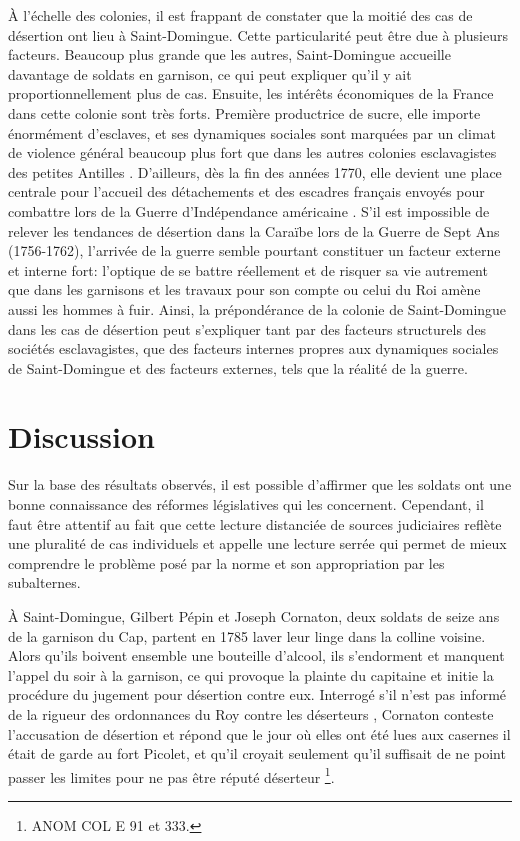 \documentclass[final, fra]{anthology-ch}     %
\begin{document}
À l'échelle des colonies, il est frappant de constater que la moitié des cas de désertion ont lieu à Saint-Domingue. Cette particularité peut être due à plusieurs facteurs. Beaucoup plus grande que les autres, Saint-Domingue accueille davantage de soldats en garnison, ce qui peut expliquer qu'il y ait proportionnellement plus de cas. Ensuite, les intérêts économiques de la France dans cette colonie sont très forts. Première productrice de sucre, elle importe énormément d'esclaves, et ses dynamiques sociales sont marquées par un climat de violence général beaucoup plus fort que dans les autres colonies esclavagistes des petites Antilles \cite{Rogers_raciser_la_société,butel-histoire-des-antilles}. D'ailleurs, dès la fin des années 1770, elle devient une place centrale pour l'accueil des détachements et des escadres français envoyés pour combattre lors de la Guerre d'Indépendance américaine \cite{lesueur_troupes_2009}. S'il est impossible de relever les tendances de désertion dans la Caraïbe lors de la Guerre de Sept Ans (1756-1762), l'arrivée de la guerre semble pourtant constituer un facteur externe et interne fort: l'optique de se battre réellement et de risquer sa vie autrement que dans les garnisons et les travaux pour son compte ou celui du Roi amène aussi les hommes à fuir. Ainsi, la prépondérance de la colonie de Saint-Domingue dans les cas de désertion peut s'expliquer tant par des facteurs structurels des sociétés esclavagistes, que des facteurs internes propres aux dynamiques sociales de Saint-Domingue et des facteurs externes, tels que la réalité de la guerre.


\section{Discussion}

Sur la base des résultats observés, il est possible d'affirmer que les soldats ont une bonne connaissance des réformes législatives qui les concernent. Cependant, il faut être attentif au fait que cette lecture distanciée de sources judiciaires reflète une pluralité de cas individuels
et appelle une lecture serrée qui permet de mieux comprendre le problème posé par la norme et son appropriation par les subalternes. 

À Saint-Domingue, Gilbert Pépin et Joseph Cornaton, deux soldats de seize ans de la garnison du Cap, partent en 1785 laver leur linge dans la colline voisine. Alors qu'ils boivent ensemble une bouteille d'alcool, ils s'endorment et manquent l'appel du soir à la garnison, ce qui provoque la plainte du capitaine et initie la procédure du jugement pour désertion contre eux. Interrogé \og s'il n'est pas informé de la rigueur des ordonnances du Roy contre les déserteurs \fg{}, Cornaton conteste l'accusation de désertion et répond \og que le jour où elles ont été lues aux casernes il était de garde au fort Picolet, et qu'il croyait seulement qu'il suffisait de ne point passer les limites pour ne pas être réputé déserteur \fg{}\footnote{ANOM COL E 91 et 333.}. 
\end{document}
